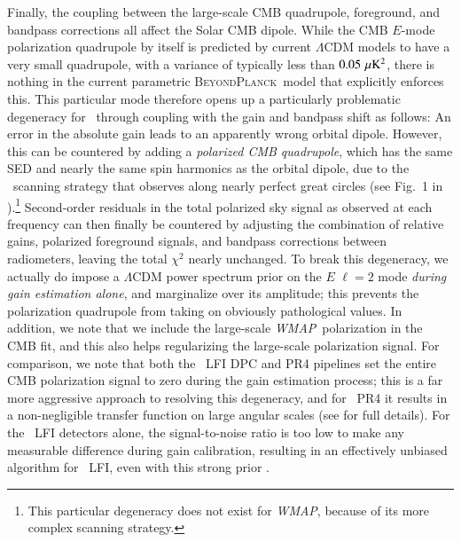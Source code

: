 \documentclass[twocolumn]{aa}
\def\WMAP{\textit{WMAP}}
\newcommand{\BP}{\textsc{BeyondPlanck}}
\begin{document}
Finally, the coupling between the large-scale CMB quadrupole,
foreground, and bandpass corrections all affect the Solar CMB
dipole. While the CMB $E$-mode polarization quadrupole by itself is
predicted by current $\Lambda$CDM models to have a very small
quadrupole, with a variance of typically less than $0.05\,\muK^2$,
there is nothing in the current parametric \BP\ model that explicitly
enforces this. This particular mode therefore opens up a particularly
problematic degeneracy for \Planck\ through coupling with the gain and
bandpass shift as follows: An error in the absolute gain leads to an
apparently wrong orbital dipole. However, this can be countered by
adding a \emph{polarized CMB quadrupole}, which has the same SED and
nearly the same spin harmonics as the orbital dipole, due to the
\Planck\ scanning strategy that observes along nearly perfect great
circles  (see Fig.~1 in \citealp{bp07}).\footnote{This particular
  degeneracy does not exist for \WMAP, because of its more complex
  scanning strategy.}  Second-order residuals in the total polarized
sky signal as observed at each frequency can then finally be countered
by adjusting the combination of relative gains, polarized foreground
signals, and bandpass corrections between radiometers, leaving the
total $\chi^2$ nearly unchanged. To break this degeneracy, we actually
do impose a $\Lambda$CDM power spectrum prior on the $E$ $\ell=2$ mode
\emph{during gain estimation alone}, and marginalize over its
amplitude; this prevents the polarization quadrupole from taking on
obviously pathological values. In addition, we note that we include
the large-scale \WMAP\ polarization in the CMB fit, and this also
helps regularizing the large-scale polarization signal. For
comparison, we note that both the \Planck\ LFI DPC and PR4 pipelines
set the entire CMB polarization signal to zero during the gain
estimation process; this is a far more aggressive approach to
resolving this degeneracy, and for \Planck\ PR4 it results in a
non-negligible transfer function on large angular scales (see
\citep{npipe} for full details). For the \Planck\ LFI detectors alone,
the signal-to-noise ratio is too low to make any measurable difference
during gain calibration, resulting in an effectively unbiased
algorithm for \Planck\ LFI, even with this strong prior
\citep{planck2014-a04}.
\end{document}
